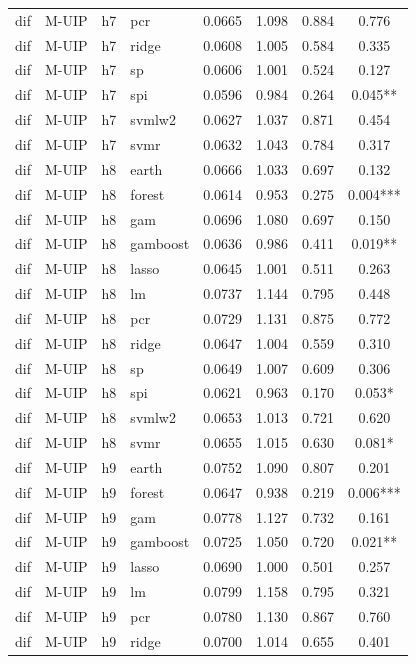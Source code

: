 \begin{ThreePartTable}
\begin{longtable}[t]{llclcccc}
dif & M-UIP & h7 & pcr & 0.0665 & 1.098 & 0.884 & 0.776\\
dif & M-UIP & h7 & ridge & 0.0608 & 1.005 & 0.584 & 0.335\\
dif & M-UIP & h7 & sp & 0.0606 & 1.001 & 0.524 & 0.127\\
dif & M-UIP & h7 & spi & 0.0596 & 0.984 & 0.264 & 0.045**\\
dif & M-UIP & h7 & svmlw2 & 0.0627 & 1.037 & 0.871 & 0.454\\
dif & M-UIP & h7 & svmr & 0.0632 & 1.043 & 0.784 & 0.317\\
\addlinespace
dif & M-UIP & h8 & earth & 0.0666 & 1.033 & 0.697 & 0.132\\
dif & M-UIP & h8 & forest & 0.0614 & 0.953 & 0.275 & 0.004***\\
dif & M-UIP & h8 & gam & 0.0696 & 1.080 & 0.697 & 0.150\\
dif & M-UIP & h8 & gamboost & 0.0636 & 0.986 & 0.411 & 0.019**\\
dif & M-UIP & h8 & lasso & 0.0645 & 1.001 & 0.511 & 0.263\\
dif & M-UIP & h8 & lm & 0.0737 & 1.144 & 0.795 & 0.448\\
dif & M-UIP & h8 & pcr & 0.0729 & 1.131 & 0.875 & 0.772\\
dif & M-UIP & h8 & ridge & 0.0647 & 1.004 & 0.559 & 0.310\\
dif & M-UIP & h8 & sp & 0.0649 & 1.007 & 0.609 & 0.306\\
dif & M-UIP & h8 & spi & 0.0621 & 0.963 & 0.170 & 0.053*\\
dif & M-UIP & h8 & svmlw2 & 0.0653 & 1.013 & 0.721 & 0.620\\
dif & M-UIP & h8 & svmr & 0.0655 & 1.015 & 0.630 & 0.081*\\
\addlinespace
dif & M-UIP & h9 & earth & 0.0752 & 1.090 & 0.807 & 0.201\\
dif & M-UIP & h9 & forest & 0.0647 & 0.938 & 0.219 & 0.006***\\
dif & M-UIP & h9 & gam & 0.0778 & 1.127 & 0.732 & 0.161\\
dif & M-UIP & h9 & gamboost & 0.0725 & 1.050 & 0.720 & 0.021**\\
dif & M-UIP & h9 & lasso & 0.0690 & 1.000 & 0.501 & 0.257\\
dif & M-UIP & h9 & lm & 0.0799 & 1.158 & 0.795 & 0.321\\
dif & M-UIP & h9 & pcr & 0.0780 & 1.130 & 0.867 & 0.760\\
dif & M-UIP & h9 & ridge & 0.0700 & 1.014 & 0.655 & 0.401\\

\end{longtable}
\end{ThreePartTable}
